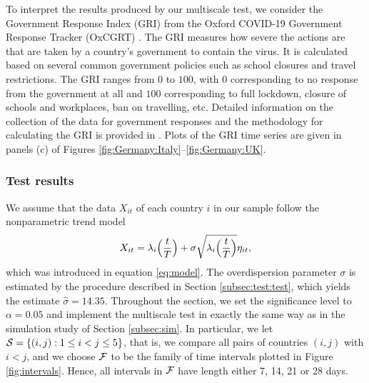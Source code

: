 \documentclass[a4paper,12pt]{article}
\numberwithin{equation}{section}
\begin{document}
To interpret the results produced by our multiscale test, we consider the Government Response Index (GRI) from the Oxford COVID-19 Government Response Tracker (OxCGRT) \citep{Hale2020}. The GRI measures how severe the actions are that are taken by a country's government to contain the virus. It is calculated based on several common government policies such as school closures and travel restrictions. The GRI ranges from $0$ to $100$, with $0$ corresponding to no response from the government at all and $100$ corresponding to full lockdown, closure of schools and workplaces, ban on travelling, etc. Detailed information on the collection of the data for government responses and the methodology for calculating the GRI is provided in \cite{Hale2020paper}. Plots of the GRI time series are given in panels (c) of Figures \ref{fig:Germany:Italy}--\ref{fig:Germany:UK}.


\subsubsection{Test results}


We assume that the data $X_{it}$ of each country $i$ in our sample follow the nonparametric trend model 
\[ X_{it} = \lambda_i\Big(\frac{t}{T}\Big) + \sigma \sqrt{\lambda_i\Big(\frac{t}{T}\Big)} \eta_{it}, \]
which was introduced in equation \eqref{eq:model}. The overdispersion parameter $\sigma$ is estimated by the procedure described in Section \ref{subsec:test:test}, which yields the estimate $\widehat{\sigma} = 14.35$. Throughout the section, we set the significance level to $\alpha=0.05$ and implement the multiscale test in exactly the same way as in the simulation study of Section \ref{subsec:sim}. In particular, we let $\mathcal{S} = \{ (i,j): 1 \le i < j \le 5\}$, that is, we compare all pairs of countries $(i,j)$ with $i < j$, and we choose $\mathcal{F}$ to be the family of time intervals plotted in Figure \ref{fig:intervals}. Hence, all intervals in $\mathcal{F}$ have length either 7, 14, 21 or 28 days. 
\end{document}
